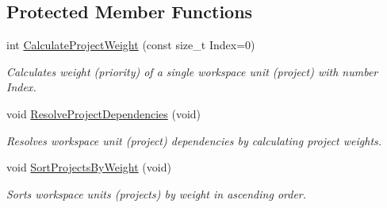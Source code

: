 \subsection*{Protected Member Functions}
\begin{DoxyCompactItemize}
\item 
int \hyperlink{classCCodeBlocksWorkspace_a744f6469c1941fa666eb7107bf4a4e02}{Calculate\-Project\-Weight} (const size\-\_\-t Index=0)
\begin{DoxyCompactList}\small\item\em Calculates weight (priority) of a single workspace unit (project) with number {\itshape Index}. \end{DoxyCompactList}\item 
void \hyperlink{classCCodeBlocksWorkspace_a1e1ed6973a47f6ed7a73c2769eaba68d}{Resolve\-Project\-Dependencies} (void)
\begin{DoxyCompactList}\small\item\em Resolves workspace unit (project) dependencies by calculating project weights. \end{DoxyCompactList}\item 
void \hyperlink{classCCodeBlocksWorkspace_a52cc49715dfa46321f77f099a6d9c261}{Sort\-Projects\-By\-Weight} (void)
\begin{DoxyCompactList}\small\item\em Sorts workspace units (projects) by weight in ascending order. \end{DoxyCompactList}\end{DoxyCompactItemize}
